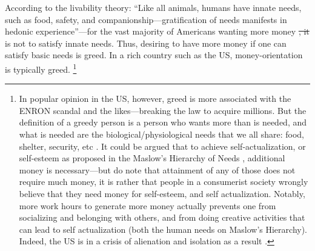 \documentclass[10pt, letterpaper]{article}
\providecommand{\DIFdeltex}[1]{{\protect\color{red}\sout{#1}}}                      %
\providecommand{\DIFdelbegin}{} %
\providecommand{\DIFdelend}{} %
\providecommand{\DIFdel}[1]{\texorpdfstring{\DIFdeltex{#1}}{}} %
\newcommand{\DIFscaledelfig}{0.5}
\newlength{\DIFdelgraphicswidth} %
\newlength{\DIFdelgraphicsheight} %
\newcommand{\DIFdelincludegraphics}[2][]{%
\sbox{\DIFdelgraphicsbox}{\DIFOincludegraphics[#1]{#2}}%
\settoboxwidth{\DIFdelgraphicswidth}{\DIFdelgraphicsbox} %
\settoboxtotalheight{\DIFdelgraphicsheight}{\DIFdelgraphicsbox} %
\scalebox{\DIFscaledelfig}{%
\parbox[b]{\DIFdelgraphicswidth}{\usebox{\DIFdelgraphicsbox}\\[-\baselineskip] \rule{\DIFdelgraphicswidth}{0em}}\llap{\resizebox{\DIFdelgraphicswidth}{\DIFdelgraphicsheight}{%
\setlength{\unitlength}{\DIFdelgraphicswidth}%
\begin{picture}(1,1)%
\thicklines\linethickness{2pt} %
{\color[rgb]{1,0,0}\put(0,0){\framebox(1,1){}}}%
{\color[rgb]{1,0,0}\put(0,0){\line( 1,1){1}}}%
{\color[rgb]{1,0,0}\put(0,1){\line(1,-1){1}}}%
\end{picture}%
}\hspace*{3pt}}} %
} %
\DeclareRobustCommand{\DIFdelbegin}{\DIFOdelbegin \let\includegraphics\DIFdelincludegraphics} %
\DeclareRobustCommand{\DIFdelend}{\DIFOaddend \let\includegraphics\DIFOincludegraphics} %
\begin{document}
\begin{spacing}{1.8}
 According to the  livability theory:
 ``Like all animals, humans have innate needs, such as food, safety, and
 companionship---gratification of needs manifests in hedonic
 experience''\citep{veenhoven14b}---for the vast majority of Americans wanting
 more money \DIFdelbegin \DIFdel{, it }\DIFdelend is not to satisfy innate needs.
%
 Thus, desiring to have more money if one can
 satisfy basic needs is greed. In a rich country such as the US, money-orientation is typically greed.
 \footnote{In popular opinion in the US, however,
   greed is more associated with the ENRON scandal and the likes---breaking the
   law to acquire millions. But the definition of a greedy person is a
   person who wants more than is needed, and what is needed are the
   biological/physiological needs that we all share: food, shelter, security,
   etc \citep{veenhoven14b}. It could be argued that to achieve
   self-actualization, or self-esteem as proposed in the Maslow's Hierarchy of Needs \citep{maslow87}, additional money is necessary---but do note that attainment of any of those does not require much money, it is rather that people in a consumerist society wrongly believe that they need money for self-esteem, and self actualization. 
Notably, more work hours to generate more money actually prevents one from socializing and belonging with others, and from doing creative activities that can lead to self actualization (both the human needs on Maslow's Hierarchy). Indeed, the US is in a crisis of alienation and isolation as a result \citep{putnam01,wilkinson09}.}


\end{spacing}
\end{document}

